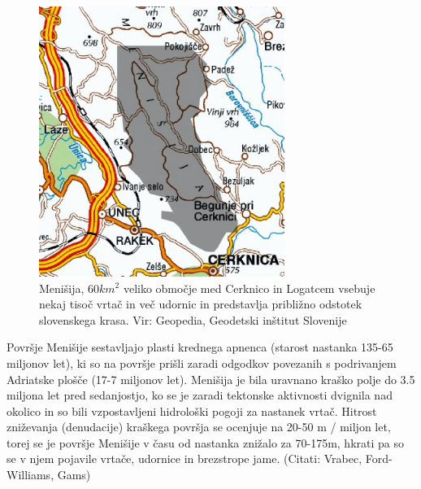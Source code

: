 \documentclass[a4paper, oneside, 12pt]{book}
\begin{document}
\begin{figure}[H]
  \centering
  \includegraphics[width=8cm]{slike/menisija-karta}
  \caption{Menišija, $60 km^2$ veliko območje med Cerknico in Logatcem vsebuje nekaj tisoč vrtač in več udornic in predstavlja približno odstotek slovenskega krasa. Vir: Geopedia, Geodetski inštitut Slovenije}
  \label{fig:menisija-karta}
\end{figure}

Površje Menišije sestavljajo plasti krednega apnenca (starost nastanka 135-65 miljonov let), ki so na površje prišli zaradi odgodkov povezanih s podrivanjem Adriatske plošče (17-7 miljonov let). Menišija je bila uravnano kraško polje do 3.5 miljona let pred sedanjostjo, ko se je zaradi tektonske aktivnosti dvignila nad okolico in so bili vzpostavljeni hidrološki pogoji za nastanek vrtač. Hitrost zniževanja (denudacije) kraškega površja se ocenjuje na 20-50 m / miljon let, torej se je površje Menišije v času od nastanka znižalo za 70-175m, hkrati pa so se v njem pojavile vrtače, udornice in brezstrope jame. (Citati: Vrabec, Ford-Williams, Gams)
\end{document}
